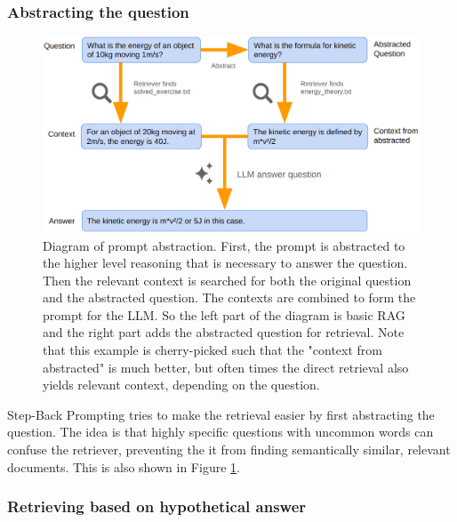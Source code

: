 \subsubsection{Abstracting the question}

\begin{figure}[h]
	\centering
	\includegraphics[width=0.9\linewidth]{fig/rag_abstract_prompt.png}
	\caption{Diagram of prompt abstraction. First, the prompt is abstracted to the higher level reasoning that is necessary to answer the question. Then the relevant context is searched for both the original question and the abstracted question. The contexts are combined to form the prompt for the LLM. So the left part of the diagram is basic RAG and the right part adds the abstracted question for retrieval. Note that this example is cherry-picked such that the "context from abstracted" is much better, but often times the direct retrieval also yields relevant context, depending on the question.}
	\label{fig:rag_abstract_prompt}
\end{figure}

Step-Back Prompting \cite{zheng2023takeastepback} tries to make the retrieval easier by first abstracting the question. The idea is that highly specific questions with uncommon words can confuse the retriever, preventing the it from finding semantically similar, relevant documents. This is also shown in Figure \ref{fig:rag_abstract_prompt}.

\subsubsection{Retrieving based on hypothetical answer}

